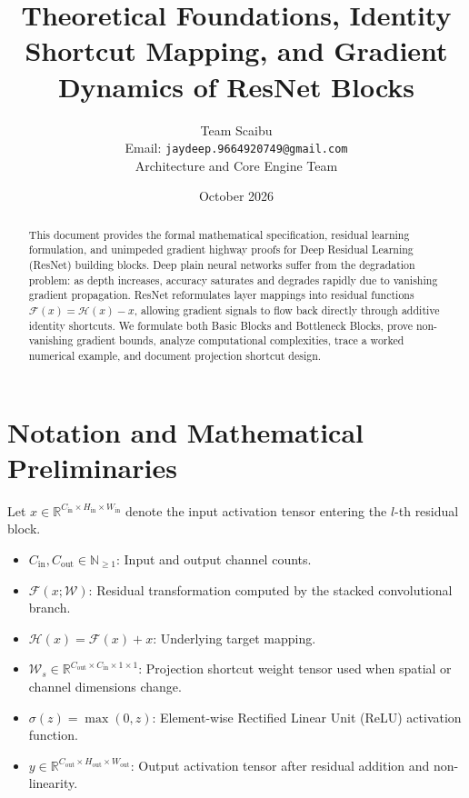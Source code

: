 \documentclass[11pt,a4paper]{article}
\title{\textbf{Theoretical Foundations, Identity Shortcut Mapping, and Gradient Dynamics of ResNet Blocks}}
\author{Team Scaibu \\ \small Email: \texttt{jaydeep.9664920749@gmail.com} \\ \small Architecture and Core Engine Team}
\date{October 2026}
\theoremstyle{definition}
\begin{document}
\maketitle

\begin{abstract}
This document provides the formal mathematical specification, residual learning formulation, and unimpeded gradient highway proofs for Deep Residual Learning (ResNet) building blocks. Deep plain neural networks suffer from the degradation problem: as depth increases, accuracy saturates and degrades rapidly due to vanishing gradient propagation. ResNet reformulates layer mappings into residual functions $\mathcal{F}(x) = \mathcal{H}(x) - x$, allowing gradient signals to flow back directly through additive identity shortcuts. We formulate both Basic Blocks and Bottleneck Blocks, prove non-vanishing gradient bounds, analyze computational complexities, trace a worked numerical example, and document projection shortcut design.
\end{abstract}

\section{Notation and Mathematical Preliminaries}

Let $x \in \mathbb{R}^{C_{\text{in}} \times H_{\text{in}} \times W_{\text{in}}}$ denote the input activation tensor entering the $l$-th residual block.

\begin{itemize}
    \item $C_{\text{in}}, C_{\text{out}} \in \mathbb{N}_{\ge 1}$: Input and output channel counts.
    \item $\mathcal{F}(x; \mathcal{W})$: Residual transformation computed by the stacked convolutional branch.
    \item $\mathcal{H}(x) = \mathcal{F}(x) + x$: Underlying target mapping.
    \item $\mathcal{W}_s \in \mathbb{R}^{C_{\text{out}} \times C_{\text{in}} \times 1 \times 1}$: Projection shortcut weight tensor used when spatial or channel dimensions change.
    \item $\sigma(z) = \max(0, z)$: Element-wise Rectified Linear Unit (ReLU) activation function.
    \item $y \in \mathbb{R}^{C_{\text{out}} \times H_{\text{out}} \times W_{\text{out}}}$: Output activation tensor after residual addition and non-linearity.
\end{itemize}
\end{document}
